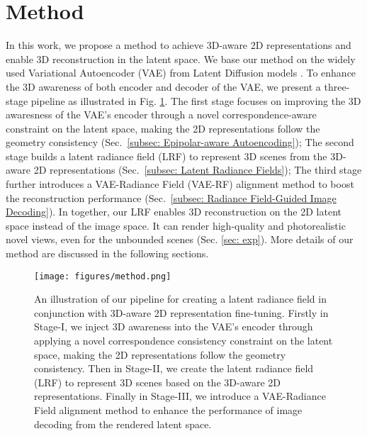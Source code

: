 
\section{Method}


In this work, we propose a method to achieve 3D-aware 2D representations and enable 3D reconstruction in the latent space. We base our method on the widely used Variational Autoencoder (VAE) from Latent Diffusion models \citep{metzer2022latent}. To enhance the 3D awareness of both encoder and decoder of the VAE, we present a three-stage pipeline as illustrated in Fig. \ref{fig:pipeline}. The first stage focuses on improving the 3D awaresness of the VAE's encoder through a novel correspondence-aware constraint on the latent space, making the 2D representations follow the geometry consistency (Sec.~\ref{subsec: Epipolar-aware Autoencoding}); The second stage builds a latent radiance field (LRF) to represent 3D scenes from the 3D-aware 2D representations (Sec.~\ref{subsec: Latent Radiance Fields}); The third stage further introduces a VAE-Radiance Field (VAE-RF) alignment method to boost the reconstruction performance (Sec.~\ref{subsec: Radiance Field-Guided Image Decoding}). In together, our LRF enables 3D reconstruction on the 2D latent space instead of the image space. It can render high-quality and photorealistic novel views, even for the unbounded scenes (Sec. \ref{sec: exp}). More details of our method are discussed in the following sections.


\begin{figure}[!t]
    \centering
    \texttt{[image: figures/method.png]}
    \vspace{-1em}
    \caption{An illustration of  our pipeline for creating a latent radiance field in conjunction with 3D-aware 2D representation fine-tuning. 
    Firstly in Stage-I, we inject 3D awareness into the VAE’s encoder through applying a novel correspondence consistency constraint on the latent space, making the 2D representations follow the geometry consistency. Then in Stage-II, we create the latent radiance field (LRF) to represent 3D scenes based on the 3D-aware 2D representations. Finally in Stage-III, we introduce a VAE-Radiance Field alignment method to enhance the performance of image decoding from the  rendered latent space.
}
\vspace{.5em}
    \label{fig:pipeline}
\end{figure}

